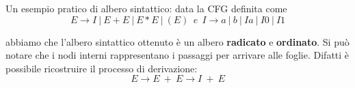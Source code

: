 \documentclass[11pt]{article}
\begin{document}
Un esempio pratico di albero sintattico: data la CFG definita come
\begin{equation}
E \rightarrow I\medspace |\medspace E+ E\medspace |\medspace E*E\medspace |\medspace (E)\medspace \medspace e \medspace \medspace I \rightarrow a\medspace |\medspace b \medspace |\medspace Ia\medspace |\medspace I0\medspace |\medspace I1
\end{equation}


\begin{center}
\end{center}
abbiamo che l'albero sintattico ottenuto è un albero \textbf{radicato} e \textbf{ordinato}. Si può notare che i \color{blue}nodi interni \color{black} rappresentano i passaggi per arrivare alle \color{red}foglie\color{black}. Difatti è possibile ricostruire il processo di derivazione: $$E \rightarrow E \medspace + \medspace E \rightarrow I \medspace + \medspace E$$
\end{document}
